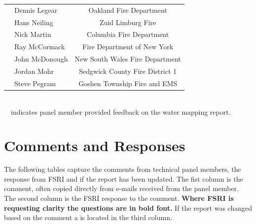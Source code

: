 \documentclass[12pt,oneside]{book}
\begin{document}
\begin{table}[!ht]
\begin{tabular}{llc}
		\checkmark & Dennis Legear    & Oakland Fire Department \\ 
		\checkmark & Hans Neiling     & Zuid Limburg Fire \\ 
		& Nick Martin      & Columbia Fire Department \\ 
		& Ray McCormack    & Fire Department of New York \\ 
		& John McDonough   & New South Wales Fire Department \\ 
		\checkmark & Jordan Mohr      & Sedgwick County Fire District 1 \\ 
		& Steve Pegram     & Goshen Township Fire and EMS \\ 
		\bottomrule[1.25pt]
	\end{tabular}
	\\ \checkmark~~indicates panel member provided feedback on the water mapping report.
\end{table}

\newpage



\chapter*{Comments and Responses}
\label{comments}
The following tables capture the comments from technical panel members, the response from FSRI and if the report has been updated. The fist column is the comment, often copied directly from e-mails received from the panel member. The second column is the FSRI response to the comment. \textbf{Where FSRI is requesting clarity the questions are in bold font.} If the report was changed based on the comment a \checkmark is located in the third column. 
\end{document}
